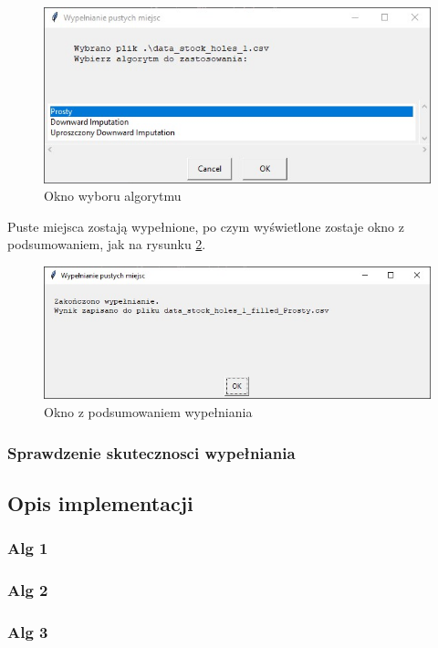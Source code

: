 \documentclass[12pt,twoside]{article}
\begin{document}
\begin{figure}[ht]
	\centering
	\includegraphics[width=12cm]{img/06.jpg}
	\caption{Okno wyboru algorytmu}
\label{Fig:fill_alg}
\end{figure}

Puste miejsca zostają wypełnione, po czym wyświetlone zostaje okno z podsumowaniem, jak na rysunku \ref{Fig:fill_end}.

\begin{figure}[ht]
	\centering
	\includegraphics[width=12cm]{img/07.jpg}
	\caption{Okno z podsumowaniem wypełniania}
\label{Fig:fill_end}
\end{figure}

\subsubsection{Sprawdzenie skutecznosci wypełniania}
\subsection{Opis implementacji}
\subsubsection{Alg 1}
\subsubsection{Alg 2}
\subsubsection{Alg 3}
\end{document}
